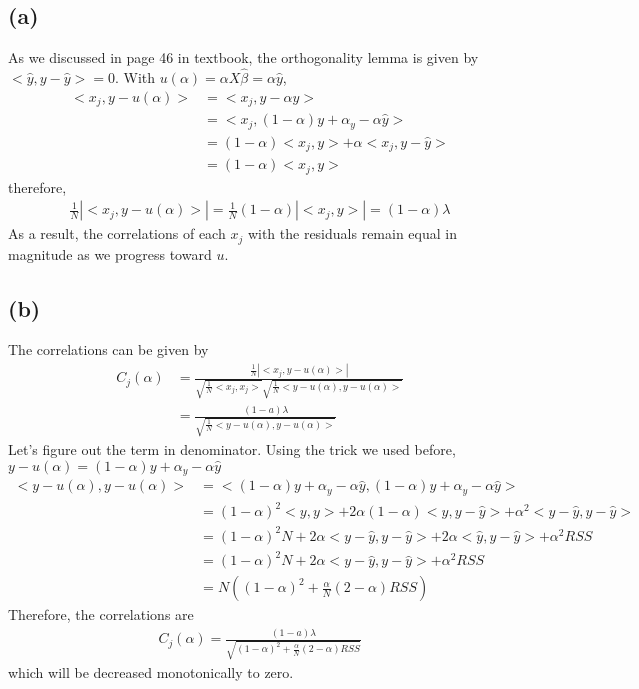 \documentclass[pra,groupedaddress,amsmath,amssymb, column]{revtex4}
\begin{document}
\subsection*{(a)}
As we discussed in page 46 in textbook, the orthogonality lemma is given by $<\hat{y}, y-\hat{y}>=0$. With $u(\alpha)=\alpha X\hat{\beta}=\alpha\hat{y}$, 
\begin{align}
<x_j, y-u(\alpha)> &= <x_j, y - \alpha \hat y> \\
&=<x_j, (1-\alpha)y + \alpha_y - \alpha \hat y>\\
&= (1-\alpha)<x_j, y> + \alpha<x_j, y-\hat y> \\
&= (1-\alpha)<x_j, y>  
\end{align}
therefore, 
\begin{align}
\frac{1}{N}|<x_j, y-u(\alpha)>| = \frac{1}{N}(1-\alpha)|<x_j, y>| = (1-\alpha)\lambda
\end{align}
As a result, the correlations of each $x_j$ with the residuals remain equal in magnitude as we progress toward $u$.
\subsection*{(b)}
The correlations can be given by
\begin{align}
C_j(\alpha) &= \frac{\frac{1}{N}|<x_j, y-u(\alpha)>|}{\sqrt{\frac{1}{N}<x_j,x_j>}\sqrt{\frac{1}{N}<y-u(\alpha),y-u(\alpha)>}}\\
&= \frac{(1-a)\lambda}{\sqrt{\frac{1}{N}<y-u(\alpha),y-u(\alpha)>}}
\end{align}
Let's figure out the term in denominator. Using the trick we used before, $ y-u(\alpha)=(1-\alpha)y + \alpha_y - \alpha \hat y$
\begin{align}
<y-u(\alpha),y-u(\alpha)> &= < (1-\alpha)y + \alpha_y - \alpha \hat y, (1-\alpha)y + \alpha_y - \alpha \hat y>\\
&=(1-\alpha)^2<y,y> + 2\alpha(1-\alpha)<y,y-\hat y>+\alpha^2<y-\hat y, y-\hat y>\\
&=(1-\alpha)^2N +2\alpha <y-\hat y, y-\hat y> +2\alpha <\hat y, y- \hat y> + \alpha^2 RSS\\
&=(1-\alpha)^2N + 2\alpha<y-\hat y, y-\hat y> +\alpha^2 RSS\\
&=N\left(  (1-\alpha)^2 + \frac{\alpha}{N}(2 - \alpha) RSS   \right)
\end{align}
Therefore, the correlations are
\begin{align}
C_j(\alpha) =  \frac{(1-a)\lambda}{\sqrt{  (1-\alpha)^2 + \frac{\alpha}{N}(2 - \alpha) RSS}}
\end{align}
which will be decreased monotonically to zero.
\end{document}
